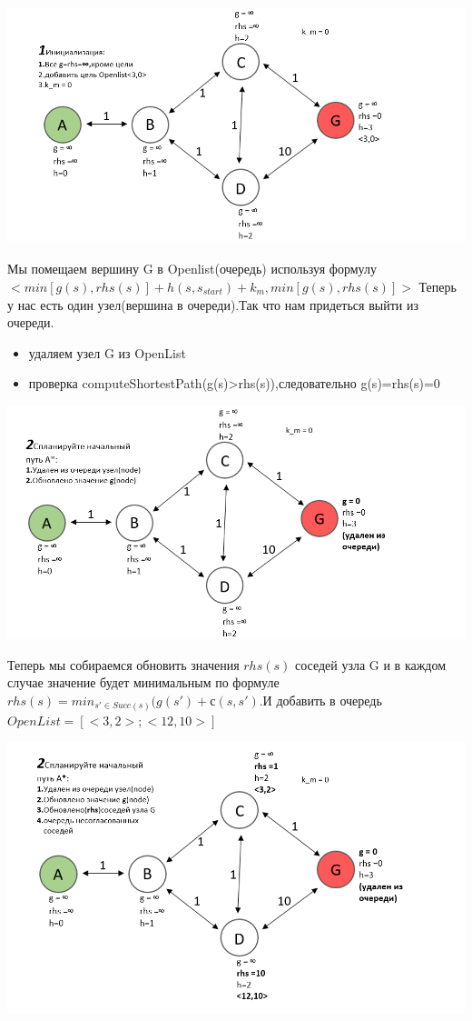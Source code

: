 \documentclass[12pt]{article}
\begin{document}
\begin{center}
        \includegraphics[width=1\textwidth]{img/example1.png}
    \end{center}
Мы помещаем вершину G в Openlist(очередь) используя формулу\\
$<min[g(s),rhs(s)]+h(s,s_{start})+k_m,min[g(s),rhs(s)]>$
Теперь у нас есть один узел(вершина в очереди).Так что нам придеться выйти из очереди.
\begin{itemize}
    \item удаляем узел G из OpenList
    \item проверка computeShortestPath(g(s)>rhs(s)),следовательно g(s)=rhs(s)=0
\end{itemize}
\begin{center}
        \includegraphics[width=1\textwidth]{img/example2.png}
    \end{center}    
Теперь мы собираемся обновить значения $rhs(s)$ соседей узла G  и в каждом случае значение будет минимальным по формуле $rhs(s)=min_{s'\in Succ(s)}(g(s')+с(s,s')$.И добавить в очередь $OpenList=[<3,2>;<12,10>]$
\begin{center}
        \includegraphics[width=1\textwidth]{img/example2_1.png}
    \end{center}
\end{document}
